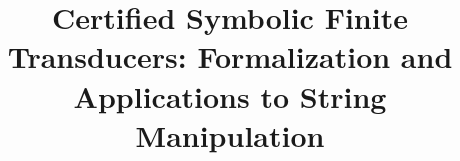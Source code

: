 \documentclass[sigplan,10pt,anonymous,review]{acmart}\settopmatter{printfolios=true,printccs=false,printacmref=false}
\begin{document}
\setlength{\pdfpageheight}{\paperheight}
\setlength{\pdfpagewidth}{\paperwidth}



\title{Certified Symbolic Finite Transducers: Formalization and Applications to String Manipulation}



\maketitle


















\end{document}
